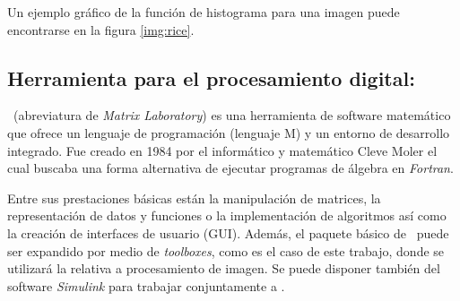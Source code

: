 Un ejemplo gráfico de la función de histograma para una imagen puede encontrarse en la figura \ref{img:rice}.


\subsection{Herramienta para el procesamiento digital: \MATLAB}\label{sec:matlab}
\MATLAB\ (abreviatura de {\em Matrix Laboratory}) es una herramienta de software matemático que ofrece un lenguaje de programación (lenguaje M) y un entorno de desarrollo integrado. Fue creado en 1984 por el informático y matemático Cleve Moler el cual buscaba una forma alternativa de ejecutar programas de álgebra en {\em Fortran}.

Entre sus prestaciones básicas están la manipulación de matrices, la representación de datos y funciones o la implementación de algoritmos así como la creación de interfaces de usuario (GUI). Además, el paquete básico de \MATLAB\ puede ser expandido por medio de {\em toolboxes}, como es el caso de este trabajo, donde se utilizará la relativa  a procesamiento de imagen. Se puede disponer también del software {\em Simulink} para trabajar conjuntamente a \MATLAB.

